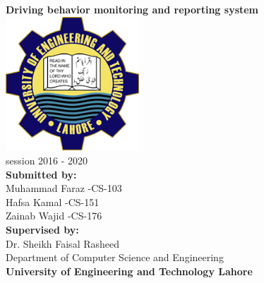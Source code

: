 \documentclass[11pt,oneside]{book}
\begin{document}

\frontmatter

\begin{titlepage}



\begin{center}

\linespread{1.2}\huge {\bfseries Driving behavior monitoring and reporting system}\\[1.5cm]
\linespread{1}
\includegraphics[width=5cm]{images/download.png}\\[1cm]
{\small session 2016 - 2020}\\[.25cm]
{\large{\bfseries Submitted by:}}\\[.05cm] %


{\large Muhammad Faraz -CS-103}\\[0 cm]%
{\large Hafsa Kamal \quad \quad {}-CS-151}\\[0 cm]%
{\large Zainab Wajid \quad \quad {}-CS-176}\\[0.5cm]



{\large{\bfseries Supervised by:}}\\[.05cm] 
{\large Dr. Sheikh Faisal Rasheed}\\[0.5cm]

{\large Department of Computer Science and Engineering}\\[0.05cm]
{\large{\bfseries University of Engineering and Technology Lahore}}\\[.05cm] 
\end{center}

\end{titlepage}
\end{document}
